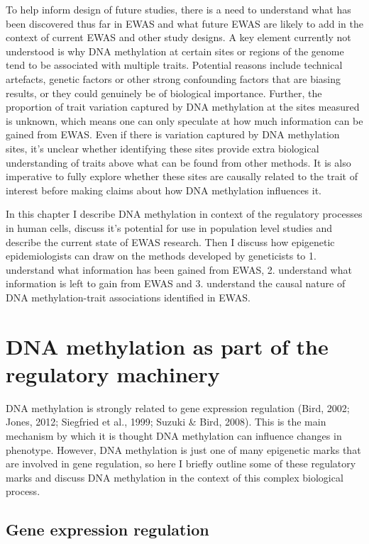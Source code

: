\documentclass[11pt,twoside]{bristolthesis}
\begin{document}
To help inform design of future studies, there is a need to understand what has been discovered thus far in EWAS and what future EWAS are likely to add in the context of current EWAS and other study designs. A key element currently not understood is why DNA methylation at certain sites or regions of the genome tend to be associated with multiple traits. Potential reasons include technical artefacts, genetic factors or other strong confounding factors that are biasing results, or they could genuinely be of biological importance. Further, the proportion of trait variation captured by DNA methylation at the sites measured is unknown, which means one can only speculate at how much information can be gained from EWAS. Even if there is variation captured by DNA methylation sites, it's unclear whether identifying these sites provide extra biological understanding of traits above what can be found from other methods. It is also imperative to fully explore whether these sites are causally related to the trait of interest before making claims about how DNA methylation influences it.

In this chapter I describe DNA methylation in context of the regulatory processes in human cells, discuss it's potential for use in population level studies and describe the current state of EWAS research. Then I discuss how epigenetic epidemiologists can draw on the methods developed by geneticists to 1. understand what information has been gained from EWAS, 2. understand what information is left to gain from EWAS and 3. understand the causal nature of DNA methylation-trait associations identified in EWAS.

\hypertarget{dna-methylation-as-part-of-the-regulatory-machinery}{%
\section{DNA methylation as part of the regulatory machinery}\label{dna-methylation-as-part-of-the-regulatory-machinery}}

DNA methylation is strongly related to gene expression regulation (Bird, 2002; Jones, 2012; Siegfried et al., 1999; Suzuki \& Bird, 2008). This is the main mechanism by which it is thought DNA methylation can influence changes in phenotype. However, DNA methylation is just one of many epigenetic marks that are involved in gene regulation, so here I briefly outline some of these regulatory marks and discuss DNA methylation in the context of this complex biological process.

\hypertarget{gene-expression-regulation}{%
\subsection{Gene expression regulation}\label{gene-expression-regulation}}
\end{document}
